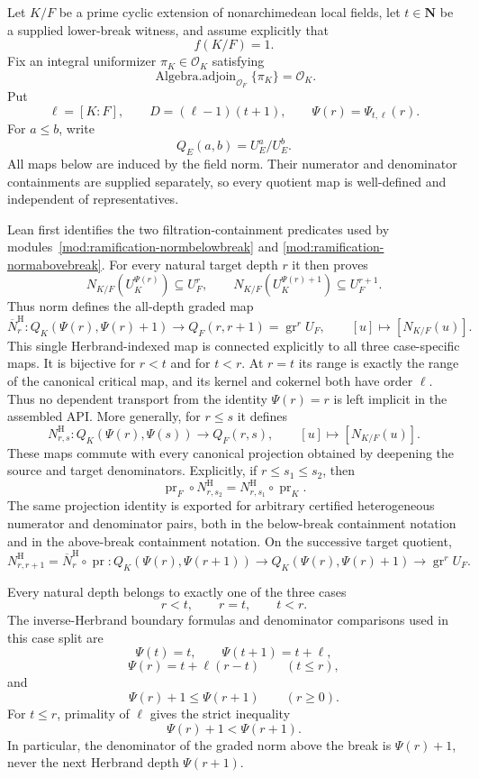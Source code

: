 \begin{theorem}
\label{mod:ramification-normfiltration}
Let $K/F$ be a prime cyclic extension of nonarchimedean local fields,
let $t\in\mathbf N$ be a supplied lower-break witness, and assume explicitly
that
\[
 f(K/F)=1.
\]
Fix an integral uniformizer $\pi_K\in\mathcal O_K$ satisfying
\[
 \operatorname{Algebra.adjoin}_{\mathcal O_F}\{\pi_K\}=\mathcal O_K.
\]
Put
\[
 \ell=[K:F],\qquad
 D=(\ell-1)(t+1),\qquad
 \Psi(r)=\Psi_{t,\ell}(r).
\]
For $a\le b$, write
\[
 Q_E(a,b)=U_E^a/U_E^b.
\]
All maps below are induced by the field norm.  Their numerator and
denominator containments are supplied separately, so every quotient map is
well-defined and independent of representatives.

Lean first identifies the two filtration-containment predicates used by
modules~\ref{mod:ramification-normbelowbreak} and
\ref{mod:ramification-normabovebreak}.  For every natural target depth $r$ it
then proves
\[
 N_{K/F}(U_K^{\Psi(r)})\subseteq U_F^r,
 \qquad
 N_{K/F}(U_K^{\Psi(r)+1})\subseteq U_F^{r+1}.
\]
Thus norm defines the all-depth graded map
\[
 \overline N_r^{\mathrm H}:
 Q_K(\Psi(r),\Psi(r)+1)\longrightarrow
 Q_F(r,r+1)=\operatorname{gr}^rU_F,
 \qquad [u]\longmapsto[N_{K/F}(u)].
\]
This single Herbrand-indexed map is connected explicitly to all three
case-specific maps.  It is bijective for $r<t$ and for $t<r$.  At $r=t$
its range is exactly the range of the canonical critical map, and its
kernel and cokernel both have order $\ell$.  Thus no dependent transport
from the identity $\Psi(r)=r$ is left implicit in the assembled API.
More generally, for $r\le s$ it defines
\[
 N^{\mathrm H}_{r,s}:
 Q_K(\Psi(r),\Psi(s))\longrightarrow Q_F(r,s),
 \qquad [u]\longmapsto[N_{K/F}(u)].
\]
These maps commute with every canonical projection obtained by deepening
the source and target denominators.  Explicitly, if
$r\le s_1\le s_2$, then
\[
 \operatorname{pr}_F\circ N^{\mathrm H}_{r,s_2}
 =
 N^{\mathrm H}_{r,s_1}\circ\operatorname{pr}_K.
\]
The same projection identity is exported for arbitrary certified
heterogeneous numerator and denominator pairs, both in the below-break
containment notation and in the above-break containment notation.  On the
successive target quotient,
\[
 N^{\mathrm H}_{r,r+1}
 =
 \overline N_r^{\mathrm H}\circ
 \operatorname{pr}:
 Q_K(\Psi(r),\Psi(r+1))
 \longrightarrow Q_K(\Psi(r),\Psi(r)+1)
 \longrightarrow\operatorname{gr}^rU_F.
\]

Every natural depth belongs to exactly one of the three cases
\[
 r<t,\qquad r=t,\qquad t<r.
\]
The inverse-Herbrand boundary formulas and denominator comparisons used in
this case split are
\[
 \Psi(t)=t,\qquad
 \Psi(t+1)=t+\ell,
\]
\[
 \Psi(r)=t+\ell(r-t)\qquad(t\le r),
\]
and
\[
 \Psi(r)+1\le\Psi(r+1)\qquad(r\ge0).
\]
For $t\le r$, primality of $\ell$ gives the strict inequality
\[
 \Psi(r)+1<\Psi(r+1).
\]
In particular, the denominator of the graded norm above the break is
$\Psi(r)+1$, never the next Herbrand depth $\Psi(r+1)$.


\end{theorem}
